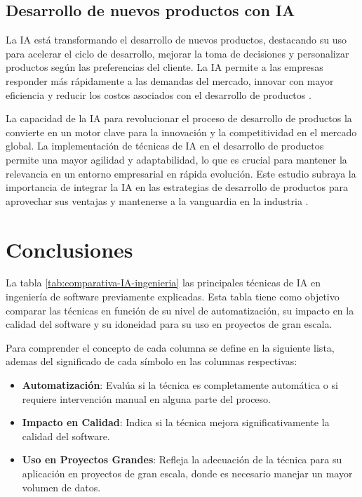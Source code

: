 \subsection{Desarrollo de nuevos productos con IA}

La IA está transformando el desarrollo de nuevos productos, destacando su uso para acelerar el ciclo de desarrollo, mejorar la toma de decisiones y personalizar productos según las preferencias del cliente. La IA permite a las empresas responder más rápidamente a las demandas del mercado, innovar con mayor eficiencia y reducir los costos asociados con el desarrollo de productos \cite{Cooper2024}.

La capacidad de la IA para revolucionar el proceso de desarrollo de productos la convierte en un motor clave para la innovación y la competitividad en el mercado global. La implementación de técnicas de IA en el desarrollo de productos permite una mayor agilidad y adaptabilidad, lo que es crucial para mantener la relevancia en un entorno empresarial en rápida evolución. Este estudio subraya la importancia de integrar la IA en las estrategias de desarrollo de productos para aprovechar sus ventajas y mantenerse a la vanguardia en la industria \cite{Cooper2024}.

\section{Conclusiones}

La tabla \ref{tab:comparativa-IA-ingenieria} las principales técnicas de IA en ingeniería de software previamente explicadas. Esta tabla tiene como objetivo comparar las técnicas en función de su nivel de automatización, su impacto en la calidad del software y su idoneidad para su uso en proyectos de gran escala.

Para comprender el concepto de cada columna se define en la siguiente lista, ademas del significado de cada símbolo en las columnas respectivas:

\begin{itemize}
	\item \textbf{Automatización}: Evalúa si la técnica es completamente automática o si requiere intervención manual en alguna parte del proceso.
	\item \textbf{Impacto en Calidad}: Indica si la técnica mejora significativamente la calidad del software.
	\item \textbf{Uso en Proyectos Grandes}: Refleja la adecuación de la técnica para su aplicación en proyectos de gran escala, donde es necesario manejar un mayor volumen de datos.
\end{itemize}

